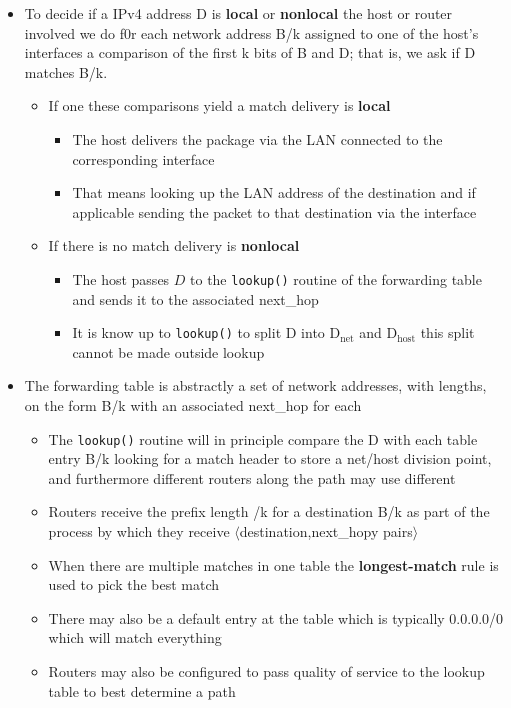 \documentclass[11pt]{article}
\providecommand{\tightlist}{%
      \setlength{\itemsep}{0pt}\setlength{\parskip}{0pt}}
\begin{document}
\begin{itemize}
\tightlist
\item
  To decide if a IPv4 address D is \textbf{local} or \textbf{nonlocal}
  the host or router involved we do f0r each network address B/k
  assigned to one of the host's interfaces a comparison of the first k
  bits of B and D; that is, we ask if D matches B/k.

  \begin{itemize}
  \tightlist
  \item
    If one these comparisons yield a match delivery is \textbf{local}

    \begin{itemize}
    \tightlist
    \item
      The host delivers the package via the LAN connected to the
      corresponding interface
    \item
      That means looking up the LAN address of the destination and if
      applicable sending the packet to that destination via the
      interface
    \end{itemize}
  \item
    If there is no match delivery is \textbf{nonlocal}

    \begin{itemize}
    \tightlist
    \item
      The host passes \(D\) to the \texttt{lookup()} routine of the
      forwarding table and sends it to the associated next\_hop
    \item
      It is know up to \texttt{lookup()} to split D into
      D\(_{\text{net}}\) and D\(_{\text{host}}\) this split cannot be
      made outside lookup
    \end{itemize}
  \end{itemize}
\item
  The forwarding table is abstractly a set of network addresses, with
  lengths, on the form B/k with an associated next\_hop for each

  \begin{itemize}
  \tightlist
  \item
    The \texttt{lookup()} routine will in principle compare the D with
    each table entry B/k looking for a match header to store a net/host
    division point, and furthermore different routers along the path may
    use different
  \item
    Routers receive the prefix length /k for a destination B/k as part
    of the process by which they receive
    \(\langle\)destination,next\_hopy pairs\(\rangle\)
  \item
    When there are multiple matches in one table the
    \textbf{longest-match} rule is used to pick the best match
  \item
    There may also be a default entry at the table which is typically
    0.0.0.0/0 which will match everything
  \item
    Routers may also be configured to pass quality of service to the
    lookup table to best determine a path
  \end{itemize}
\end{itemize}
\end{document}
